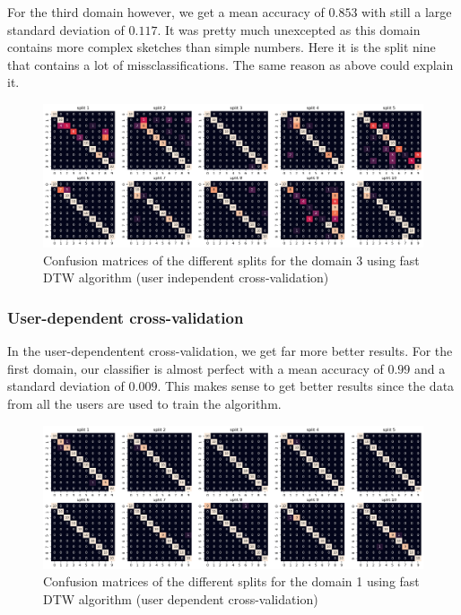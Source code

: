 For the third domain however, we get a mean accuracy of $0.853$ with still a large standard deviation of $0.117$. It was pretty much unexcepted as this domain contains more complex sketches than simple numbers. Here it is the split nine that contains a lot of missclassifications. The same reason as above could explain it.

\begin{figure}[H]
	\centering
	\includegraphics{figures/dtw/domain03/cm_dtw_d3_uindep.png}
	\caption{Confusion matrices of the different splits for the domain 3 using fast DTW algorithm (user independent cross-validation)}
	\label{fig:cm-dtw-d3-uindep}
\end{figure}

\subsubsection{User-dependent cross-validation}

In the user-dependentent cross-validation, we get far more better results. For the first domain, our classifier is almost perfect with a mean accuracy of $0.99$ and a standard deviation of $0.009$. This makes sense to get better results since the data from all the users are used to train the algorithm.

\begin{figure}[H]
	\centering
	\includegraphics{figures/dtw/domain01/cm_dtw_d1_udep.png}
	\caption{Confusion matrices of the different splits for the domain 1 using fast DTW algorithm (user dependent cross-validation)}
	\label{fig:cm-dtw-d1-udep}
\end{figure}

